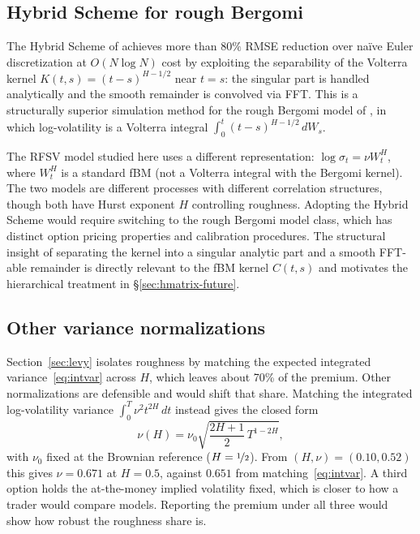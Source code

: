 \subsection{Hybrid Scheme for rough Bergomi}
\label{sec:hybrid-future}

The Hybrid Scheme of \citet{bennedsen2017hybrid} achieves more than $80\%$
RMSE reduction over naïve Euler discretization at $O(N \log N)$ cost by
exploiting the separability of the Volterra kernel $K(t,s) = (t-s)^{H-1/2}$
near $t = s$: the singular part is handled analytically and the smooth
remainder is convolved via FFT.  This is a structurally superior simulation
method for the rough Bergomi model of \citet{bayer2016pricing}, in
which log-volatility is a Volterra integral $\int_0^t (t-s)^{H-1/2}\,dW_s$.

The RFSV model studied here uses a different representation: $\log\sigma_t =
\nu W_t^H$, where $W_t^H$ is a standard fBM (not a Volterra integral with
the Bergomi kernel).  The two models are different processes with different
correlation structures, though both have Hurst exponent $H$ controlling
roughness.  Adopting the Hybrid Scheme would require switching to the rough
Bergomi model class, which has distinct option pricing properties and
calibration procedures.  The structural insight of separating the kernel into
a singular analytic part and a smooth FFT-able remainder is directly
relevant to the fBM kernel $C(t,s)$ and motivates the hierarchical treatment
in §\ref{sec:hmatrix-future}.

\subsection{Other variance normalizations}
\label{sec:variancenorm}

Section~\ref{sec:levy} isolates roughness by matching the expected integrated
variance~\eqref{eq:intvar} across $H$, which leaves about 70\% of the premium.  Other
normalizations are defensible and would shift that share.  Matching the integrated
log-volatility variance $\int_0^T \nu^2 t^{2H}\,dt$ instead gives the closed form
\begin{equation}
  \nu(H) = \nu_0\sqrt{\frac{2H+1}{2}\,T^{1-2H}},
\end{equation}
with $\nu_0$ fixed at the Brownian reference ($H = \nicefrac{1}{2}$).  From
$(H, \nu) = (0.10, 0.52)$ this gives $\nu = 0.671$ at $H = 0.5$, against $0.651$ from
matching~\eqref{eq:intvar}.  A third option holds the at-the-money implied volatility
fixed, which is closer to how a trader would compare models.  Reporting the premium
under all three would show how robust the roughness share is.

